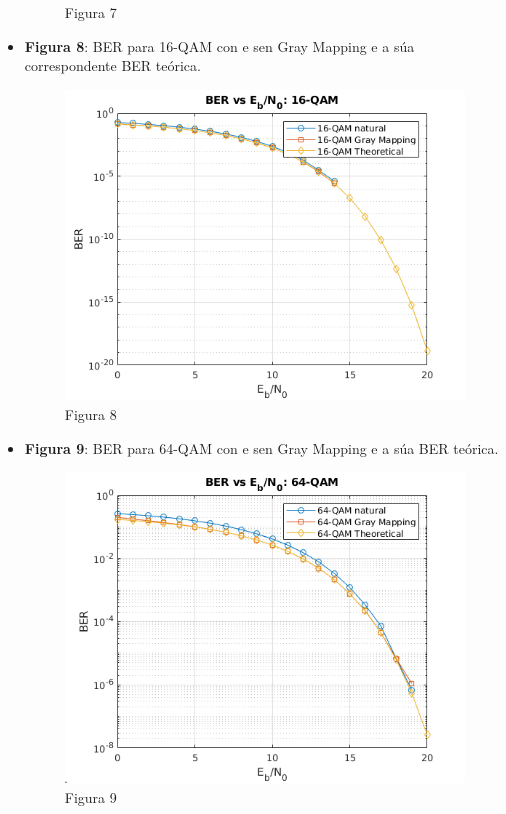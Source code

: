 \documentclass[
	10pt, %
	spanish, %
]{fphw}
\begin{document}
\begin{itemize}
\begin{figure}[htb]
\caption{Figura 7}
\end{figure}
\item \textbf{Figura 8}: BER para 16-QAM con e sen Gray Mapping e a súa correspondente BER teórica.
\begin{figure}[htb]
\centering 
\includegraphics{figura8.png}
\caption{Figura 8}
\end{figure}
\item \textbf{Figura 9}: BER para 64-QAM con e sen Gray Mapping e a súa BER teórica.
\begin{figure}[htb]
\centering 
\includegraphics{figura9.png}
\caption{Figura 9}
\end{figure}
\end{itemize}
\end{document}
